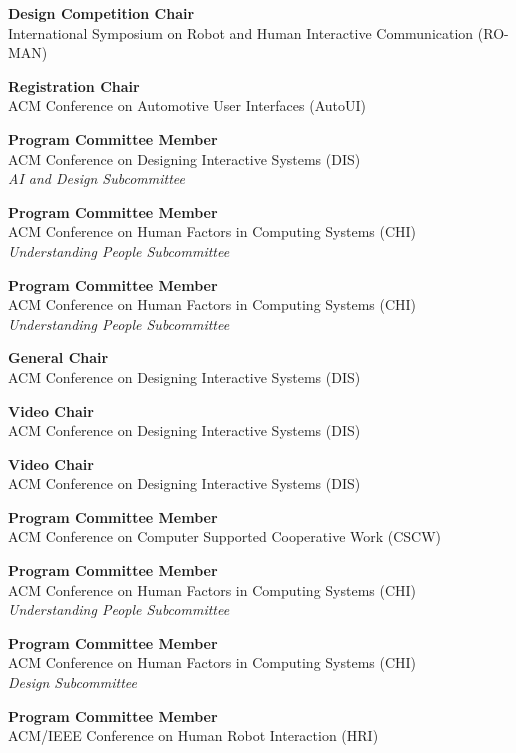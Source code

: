 \documentclass[11pt]{article} %
\begin{document}
 \textbf{Design Competition Chair}\\
International Symposium on Robot and Human Interactive Communication (RO-MAN)
\medskip

 \textbf{Registration Chair}\\
ACM Conference on Automotive User Interfaces (AutoUI)
\medskip

 \textbf{Program Committee Member}\\
ACM Conference on Designing Interactive Systems (DIS)\\ 
\textit{AI and Design Subcommittee}
\medskip

 \textbf{Program Committee Member}\\
ACM Conference on Human Factors in Computing Systems (CHI)\\ 
\textit{Understanding People Subcommittee}
\medskip

 \textbf{Program Committee Member}\\
ACM Conference on Human Factors in Computing Systems (CHI)\\ 
\textit{Understanding People Subcommittee}
\medskip

 \textbf{General Chair}\\
ACM Conference on Designing Interactive Systems (DIS)
\medskip

 \textbf{Video Chair}\\
ACM Conference on Designing Interactive Systems (DIS)
\medskip

 \textbf{Video Chair}\\
ACM Conference on Designing Interactive Systems (DIS)
\medskip

 \textbf{Program Committee Member }\\
ACM Conference on Computer Supported Cooperative Work (CSCW)
\medskip

 \textbf{Program Committee Member}\\
ACM Conference on Human Factors in Computing Systems (CHI)\\ 
\textit{Understanding People Subcommittee }
\medskip

 \textbf{Program Committee Member}\\
ACM Conference on Human Factors in Computing Systems (CHI)\\
\textit{Design Subcommittee }
\medskip

 \textbf{Program Committee Member}\\
ACM/IEEE Conference on Human Robot Interaction (HRI)
\medskip
\end{document}

